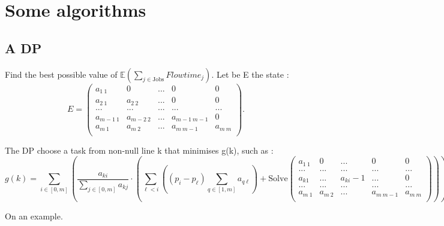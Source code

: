 \documentclass{article}
\begin{document}
\newpage
\section{Some algorithms}
\subsection{A DP}
Find the best possible value of $\mathbb{E}(\sum_{j\in\text{Jobs}}Flowtime_j)$. Let be E the state : \[
        E=\begin{pmatrix}
            a_{1\ 1} & 0 & ...& 0 & 0\\
            a_{2\ 1} & a_{2\ 2} & ...& 0 & 0 \\
            ... & ... & ... & ... & ...\\
			a_{m-1\ 1} & a_{m-2\ 2} & ...& a_{m-1\ m-1} & 0 \\	
			a_{m\ 1} & a_{m\ 2} & ... & a_{m\ m-1}& a_{m\ m} \\
        \end{pmatrix}.
    \]

The DP choose a task from non-null line k that minimises g(k), such as : $$
g(k) = \sum_{ i \in [0,m] } \left(\frac{a_{ki}}{\sum_{ j \in [0,m] } a_{kj}}\cdot \left(\sum_{\ell<i}\left(\left(p_i-p_\ell\right)\sum_{q\in[1,m]}a_{q\ell}  \right) + \text{Solve} \begin{pmatrix}
            a_{1\ 1} & 0 & ...& 0 & 0\\
            ... & ... & ... & ... & ...\\
			a_{k1} & ... & a_{ki} -1& ... & 0 \\
			... & ... & ... & ... & ...\\
			a_{m\ 1} & a_{m\ 2} & ... & a_{m\ m-1}& a_{m\ m} \\
        \end{pmatrix}\right)\right)
$$

On an example.
\end{document}
